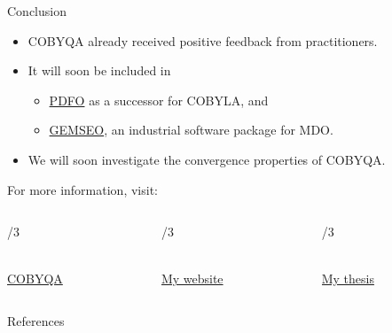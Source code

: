 \documentclass[optimization]{common/talk}
\begin{document}
\begin{frame}{Conclusion}

    \begin{itemize}
        \item COBYQA already received \alert{positive} feedback from practitioners.
        \item It will soon be included in
        \begin{itemize}
            \item \href{https://www.pdfo.net}{PDFO} as a successor for COBYLA, and
            \item \href{https://gemseo.readthedocs.io}{GEMSEO}, an \alert{industrial} software package for MDO.
        \end{itemize}
        \item We will soon investigate the convergence properties of COBYQA.
    \end{itemize}

    For more information, visit:

    \medskip

    \begin{columns}
        \begin{column}{\textwidth/3}
            \begin{center}
                \\[1ex]
                \href{https://www.cobyqa.com}{COBYQA}
            \end{center}
        \end{column}
        \begin{column}{\textwidth/3}
            \begin{center}
                \\[1ex]
                \href{https://www.tomragonneau.com}{My website}
            \end{center}
        \end{column}
        \begin{column}{\textwidth/3}
            \begin{center}
                \\[1ex]
                \href{https://tomragonneau.com/documents/thesis.pdf}{My thesis}
            \end{center}
        \end{column}
    \end{columns}
\end{frame}

\appendix

\begin{frame}[allowframebreaks]{References}
    
\end{frame}
\end{document}
